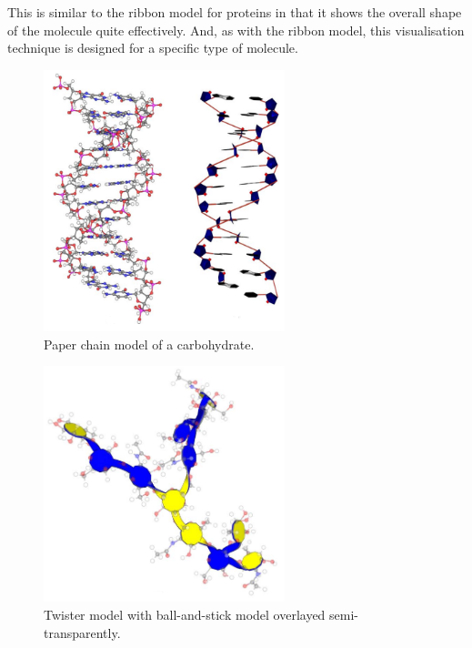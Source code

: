This is similar to the ribbon model for proteins in that it shows the overall
shape of the molecule quite effectively. And, as with the ribbon model, this
visualisation technique is designed for a specific type of molecule.

\begin{figure}[h!]
  \begin{center}
    \includegraphics[width=70mm]{paper_chain}
  \end{center}
  \caption{Paper chain model of a carbohydrate.}
  \label{fig:background_paperchain}
\end{figure}

\begin{figure}[h!]
  \begin{center}
    \includegraphics[width=70mm]{twister}
  \end{center}
  \caption{Twister model with ball-and-stick model overlayed semi-transparently.}
  \label{fig:background_twister}
\end{figure}



